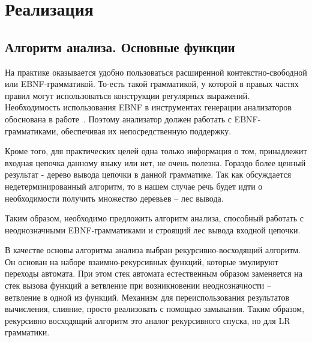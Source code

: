 \section{Реализация}
 



\subsection{Алгоритм анализа. Основные функции}

На практике оказывается удобно пользоваться расширенной контекстно-свободной или EBNF-грамматикой. То-есть такой грамматикой, у которой в правых частях правил могут использоваться конструкции регулярных выражений. Необходимость использования EBNF в инструментах генерации анализаторов обоснована в работе~\cite{Diploma}. Поэтому анализатор должен работать с EBNF-грамматиками, обеспечивая их непосредственную поддержку.

Кроме того, для практических целей одна только информация о том, принадлежит входная цепочка данному языку или нет, не очень полезна. Гораздо более ценный результат - дерево вывода цепочки в данной грамматике. Так как обсуждается недетерминированный алгоритм, то в нашем случае речь будет идти о необходимости получить множество деревьев -- лес вывода.

Таким образом, необходимо предложить алгоритм анализа, способный работать с неоднозначными EBNF-грамматиками и строящий лес вывода входной цепочки.

В качестве основы алгоритма анализа выбран рекурсивно-восходящий алгоритм. Он основан на наборе взаимно-рекурсивных функций, которые эмулируют переходы автомата. При этом стек автомата естественным образом заменяется на стек вызова функций  а ветвление при возникновении неоднозначности -- ветвление в одной из функций. Механизм для переиспользования результатов вычисления, слияние, просто реализовать с помощью замыкания. Таким образом, рекурсивно восходящий алгоритм это аналог рекурсивного спуска, но для LR грамматики.


